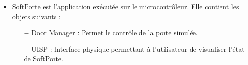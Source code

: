 \begin {itemize}
    \item SoftPorte est l'application exécutée sur le microcontrôleur. Elle contient les objets suivants :
    \begin{itemize}
        \item[$-$] Door Manager : Permet le contrôle de la porte simulée.
        \item[$-$] UISP : Interface physique permettant à l'utilisateur de visualiser l'état de SoftPorte.
    \end{itemize}
\end{itemize}
